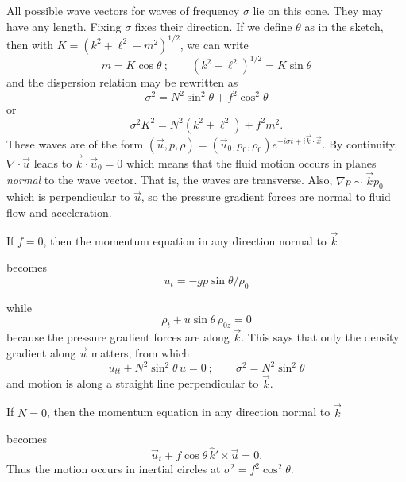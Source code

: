 \sourcepagebreak


All possible wave vectors for waves of frequency $\sigma$ lie on this cone. They may have
any length. Fixing $\sigma$ fixes their direction. If we define $\theta$ as in the sketch, then with
$K=(k^2+\ell^2+m^2)^{1/2}$, we can write
\[
	m=K\cos\theta\ ;\qquad (k^2+\ell^2)^{1/2}=K\sin\theta
\]
and the dispersion relation may be rewritten as
\[
	\sigma^2=N^2\sin^2\theta+f^2\cos^2\theta
\]
or
\[
	\sigma^2K^2=N^2(k^2+\ell^2)+f^2m^2.
\]
These waves are of the form
$(\vec u,p,\rho)=(\vec u_0,p_0,\rho_0)e^{-i\sigma t+i\vec k\cdot\vec x}$. By continuity,
$\nabla\cdot\vec u$ leads to $\vec k\cdot\vec u_0=0$ which means that the fluid motion occurs in planes \emph{normal} to the
wave vector. That is, the waves are transverse. Also, $\nabla p\sim\vec k p_0$ which is perpendicular
to $\vec u$, so the pressure gradient forces are normal to fluid flow and acceleration.

If $f=0$, then the momentum equation in any direction normal to $\vec k$


becomes
\[
	u_t=-gp\sin\theta/\rho_0
\]

\sourcepagebreak

while
\[
	\rho_t+u\sin\theta\,\rho_{0z}=0
\]
because the pressure gradient forces are along $\vec k$. This says that only the density
gradient along $\vec u$ matters, from which
\[
	u_{tt}+N^2\sin^2\theta\,u=0\ ;\qquad \sigma^2=N^2\sin^2\theta
\]
and motion is along a straight line perpendicular to $\vec k$.

If $N=0$, then the momentum equation in any direction normal to $\vec k$


becomes
\[
	\vec u_t+f\cos\theta\,\hat k'\times\vec u=0.
\]
Thus the motion occurs in inertial circles at $\sigma^2=f^2\cos^2\theta$.

